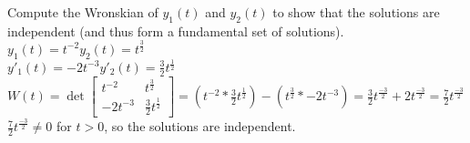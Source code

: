 \documentclass{article}
\begin{document}
\begin{enumerate}
\begin{enumerate}
Compute the Wronskian of $y_1(t)$ and $y_2(t)$ to show that the solutions are independent (and thus form a fundamental set of solutions).
\\$y_1(t)=t^{-2}$\qquad$y_2(t)=t^{\frac{3}{2}}$
\\$y'_1(t)=-2t^{-3}$\qquad$y'_2(t)=\frac{3}{2}t^{\frac{1}{2}}$
\\$W(t)=\det\begin{bmatrix}t^{-2} & t^{\frac{3}{2}} \\ -2t^{-3} & \frac{3}{2}t^{\frac{1}{2}}\end{bmatrix}=(t^{-2}*\frac{3}{2}t^{\frac{1}{2}})-(t^{\frac{3}{2}}*-2t^{-3})=\frac{3}{2}t^{\frac{-3}{2}}+2t^{\frac{-3}{2}}=\frac{7}{2}t^{\frac{-3}{2}}$
\\$\frac{7}{2}t^{\frac{-3}{2}}\ne0$ for $t>0$, so the solutions are independent.
\end{enumerate}


\end{enumerate}
\end{document}
